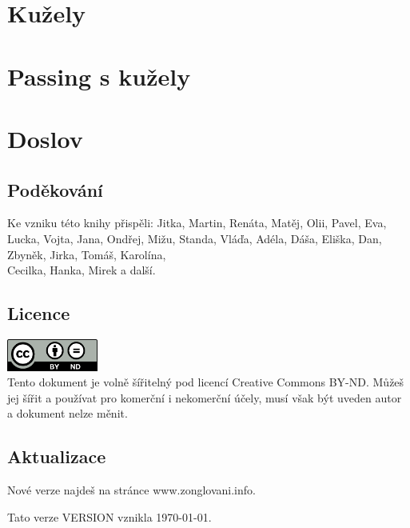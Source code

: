 \documentclass[12pt,a4paper,twoside]{book}
\begin{document}


\chapter{Kužely}



\chapter{Passing s kužely}



\chapter{Doslov}
\section{Poděkování}
Ke vzniku této knihy přispěli: Jitka, Martin, Renáta, Matěj, Olii, Pavel, Eva, Lucka, Vojta, Jana, Ondřej, Mižu, Standa, Vláďa, Adéla, Dáša, Eliška, Dan, Zbyněk, Jirka, Tomáš, Karolína,\\Cecilka, Hanka, Mirek a další.
\section{Licence}
\includegraphics[width=3cm]{obrazky/cc-by-nd.png}\\
Tento dokument je volně šířitelný pod licencí Creative Commons BY-ND.
Můžeš jej šířit a používat pro komerční i nekomerční účely, musí však být uveden autor a dokument nelze měnit.
\section{Aktualizace}
Nové verze najdeš na stránce www.zonglovani.info.

Tato verze VERSION vznikla \today.
\end{document}
